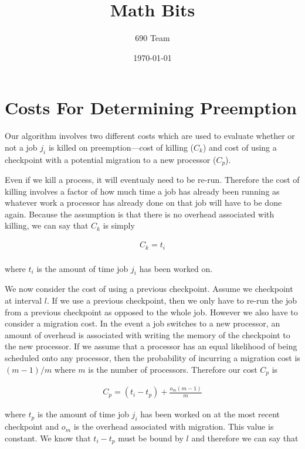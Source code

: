 \documentclass[11pt]{article}
\author{690 Team}
\date{\today}
\title{Math Bits}
\begin{document}
\maketitle

\section*{Costs For Determining Preemption}
\label{sec:org8e6e779}

Our algorithm involves two different costs which are used to evaluate whether or not a job \(j_{i}\) is killed on preemption---cost of killing (\(C_{k}\)) and cost of using a checkpoint with a potential migration to a new processor (\(C_{p}\)). 

Even if we kill a process, it will eventualy need to be re-run. Therefore the cost of killing involves a factor of how much time a job has already been running as whatever work a processor has already done on that job will have to be done again. Because the assumption is that there is no overhead associated with killing, we can say that \(C_{k}\) is simply

\begin{gather*}
C_{k} = t_{i} \\
\end{gather*}

where \(t_{i}\) is the amount of time job \(j_{i}\) has been worked on.

We now consider the cost of using a previous checkpoint. Assume we checkpoint at interval \(l\). If we use a previous checkpoint, then we only have to re-run the job from a previous checkpoint as opposed to the whole job. However we also have to consider a migration cost. In the event a job switches to a new processor, an amount of overhead is associated with writing the memory of the checkpoint to the new processor. If we assume that a processor has an equal likelihood of being scheduled onto any processor, then the probability of incurring a migration cost is \((m - 1)/m\) where \(m\) is the number of processors. Therefore our cost \(C_{p}\) is 

\begin{gather*}
C_{p} = \left( t_{i} - t_{p} \right) + \frac{o_{m} \left( m - 1 \right)}{m}
\end{gather*}

where \(t_{p}\) is the amount of time job \(j_i\) has been worked on at the most recent checkpoint and \(o_{m}\) is the overhead associated with migration. This value is constant. We know that \(t_{i} - t_{p}\) must be bound by \(l\) and therefore we can say that
\end{document}
